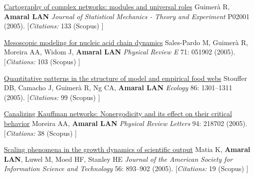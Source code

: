\NumberedItem{\makebox[0.8cm][r]{[62]}}
\href{/people/amaral/cartography-of-complex-networks-modules-and-universal-roles}
{Cartography of complex networks: modules and universal roles}
\newline
Guimer\`a R, {\textbf{Amaral LAN}}
\newline
\textit{Journal of Statistical Mechanics - Theory and Experiment}
P02001 (2005).
    [{\em{Citations:}}  133 (Scopus) ]
\newline
\Gap
~
\Gap

\NumberedItem{\makebox[0.8cm][r]{[61]}}
\href{/people/amaral/mesoscopic-modeling-for-nucleic-acid-chain-dynamics}
{Mesoscopic modeling for nucleic acid chain dynamics}
\newline
Sales-Pardo M, Guimer\`a R, Moreira AA, Widom J, {\textbf{Amaral LAN}}
\newline
\textit{Physical Review E}
    71:
051902 (2005).
    [{\em{Citations:}}  103 (Scopus) ]
\newline
\Gap
~
\Gap

\NumberedItem{\makebox[0.8cm][r]{[60]}}
\href{/people/amaral/quantitative-patterns-in-the-structure-of-model-and-empirical-food-webs}
{Quantitative patterns in the structure of model and empirical food webs}
\newline
Stouffer DB, Camacho J, Guimer\`a R, Ng CA, {\textbf{Amaral LAN}}
\newline
\textit{Ecology}
    86:
1301--1311 (2005).
    [{\em{Citations:}}  99 (Scopus) ]
\newline
\Gap
~
\Gap

\NumberedItem{\makebox[0.8cm][r]{[59]}}
\href{/people/amaral/canalizing-kauffman-networks-nonergodicity-and-its-effect-on-their-critical-behavior}
{Canalizing Kauffman networks: Nonergodicity and its effect on their critical behavior}
\newline
Moreira AA, {\textbf{Amaral LAN}}
\newline
\textit{Physical Review Letters}
    94:
218702 (2005).
    [{\em{Citations:}}  38 (Scopus) ]
\newline
\Gap
~
\Gap

\NumberedItem{\makebox[0.8cm][r]{[58]}}
\href{/people/amaral/scaling-phenomena-in-the-growth-dynamics-of-scientific-output}
{Scaling phenomena in the growth dynamics of scientific output}
\newline
Matia K, {\textbf{Amaral LAN}}, Luwel M, Moed HF, Stanley HE
\newline
\textit{Journal of the American Society for Information Science and Technology}
    56:
893--902 (2005).
    [{\em{Citations:}}  19 (Scopus) ]
\newline
\Gap
~
\Gap

